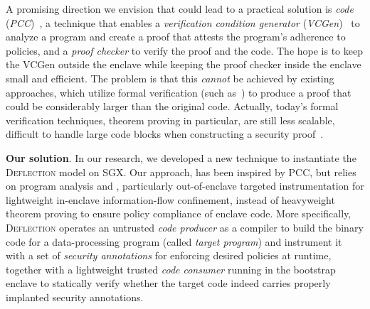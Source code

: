 
A promising direction we envision that could lead to a practical solution is \textit{\DIFdelbegin {}\DIFdelend \DIFaddbegin {}\DIFaddend code} (\textit{PCC})~\cite{necula1997proof,schneider2001language}, a technique that enables a \textit{verification condition generator} (\textit{VCGen})~\cite{colby2000certifying,leroy2006formal,pirzadeh2010extended} to analyze a program and create a proof that attests the program's adherence to policies, and a \textit{proof checker} to verify the proof and the code. The hope is to keep the VCGen outside the enclave while keeping the proof checker inside the enclave small and efficient.  The problem is that this \textit{cannot} be achieved by existing approaches, which utilize formal verification (such as~\cite{necula2001oracle,pirzadeh2010extended}) to produce a proof that could be considerably larger than the original code. Actually, today's formal verification techniques, theorem proving in particular, are still less scalable, difficult to handle large code blocks when constructing a security proof~\cite{sinha2015moat}. 


\vspace{3pt}\noindent\textbf{Our solution}. In our research, we developed a new technique to instantiate the \textsc{Deflection} model on SGX. Our approach, has been inspired by PCC, but relies on program analysis and \DIFdelbegin %
\DIFdelend \DIFaddbegin {}\DIFaddend , particularly out-of-enclave targeted instrumentation for lightweight in-enclave information-flow confinement, instead of heavyweight theorem proving to ensure policy compliance of enclave code. More specifically, \textsc{Deflection} operates an untrusted \textit{code producer} as a compiler to build the binary code for a data-processing program (called \textit{target program}) and instrument it with a set of \textit{security annotations} for enforcing desired policies at runtime, together with a lightweight trusted \textit{code consumer} running in the bootstrap enclave to statically verify whether the target code indeed carries properly implanted security annotations.


